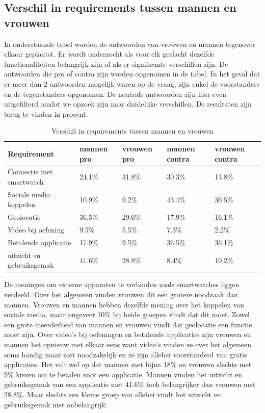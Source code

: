 \subsection{Verschil in requirements tussen mannen en vrouwen}
\label{sec:Resultaten vragenlijst}
In onderstaande tabel worden de antwoorden van vrouwen en mannen tegenover elkaar geplaatst. Er wordt onderzocht als voor elk geslacht dezelfde functionaliteiten belangrijk zijn of als er significante verschillen zijn. De antwoorden die pro of contra zijn worden opgenomen in de tabel. In het geval dat er meer dan 2 antwoorden mogelijk waren op de vraag, zijn enkel de voorstanders en de tegenstanders opgenomen. De neutrale antwoorden zijn hier even uitgefilterd omdat we opzoek zijn naar duidelijke verschillen. De resultaten zijn terug te vinden in procent.
\begin{table}[h!]
\begin{center}
\begin{tabular}{ |p{2.5cm}|p{2.3cm}|p{2.3cm}||p{2.8cm}|p{2.9cm}| }
 \hline
     \textbf{Requirement} & \textbf{mannen pro} & \textbf{vrouwen pro} & \textbf{mannen contra} & \textbf{vrouwen contra } \\
 \hline
Connectie met smartwatch   & 24.1\%    &31.8\% & 30.3\%    &13.8\%   \\
 \hline
Sociale media koppelen  & 10.9\%    &9.2\% & 43.4\%    & 36.5\%   \\
 \hline
 Geolocatie  & 36.5\%    &29.6\% & 17.9\%    & 16.1\%   \\
 \hline
  Video bij oefening  & 9.5\%    &5.5\% & 7.3\%    & 2.2\%   \\
 \hline
   Betalende applicatie  & 17.9\%    &9.5\% & 36.5\%    &  36.1\%   \\
 \hline
   uitzicht en gebruiksgemak  & 41.6\%    &28.8\% & 8.4\%    &  10.2\%   \\
 \hline
\end{tabular}
\end{center}
  \caption{Verschil in requirements tussen mannen en vrouwen}
\label{table:1}
\end{table}
De meningen om externe apparaten te verbinden zoals smartwatches liggen verdeeld. Over het algemeen vinden vrouwen dit een grotere noodzaak dan mannen. Vrouwen en mannen hebben dezelfde mening over het koppelen van sociale media, maar ongeveer 10\% bij beide groepen vindt dat dit moet. Zowel een grote meerderheid van mannen en vrouwen vindt dat geolocatie een functie moet zijn. Over video’s bij oefeningen en betalende applicaties zijn vrouwen en mannen het opnieuw met elkaar eens want video’s vinden ze over het algemeen soms handig maar niet noodzakelijk en ze zijn allebei voorstanderd van gratis applicaties. Het valt wel op dat mannen met bijna 18\% en vrouwen slechts met 9\% kiezen om te betalen voor een applicatie. Mannen vinden het uitzicht en gebruiksgemak van een applicatie met 41.6\% toch belangrijker dan vrouwen met 28.8\%. Maar slechts een kleine groep van allebei vindt het uitzicht en gebruiksgemak niet onbelangrijk.
